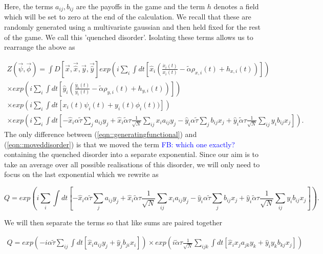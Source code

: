 \documentclass{article}
\newcommand\fb[1]{\textcolor{blue}{FB: #1}}
\begin{document}
	Here, the terms $a_{ij}, b_{ij}$ are the payoffs in the game and the term $h$ denotes a field
	which will be set to zero at the end of the calculation. We recall that these are randomly
	generated using a multivariate gaussian and then held fixed for the rest of the game. We call
	this 'quenched disorder'. Isolating these terms allows us to rearrange the above as

	\begin{equation}
	\begin{split}
	\label{eqn::moveddisorder}
		Z(\Vec{\psi}, \Vec{\phi}) = \int D[\Vec{x}, \Vec{\hat{x}}, \Vec{y}, \Vec{\hat{y}}] exp(i
		\sum_i \int dt[\hat{x}_i
		(\frac{\dot{x_i}(t)}{x_i(t)}
			- \tilde{\alpha} \rho_{x, i}(t)+ h_{x, i}(t))]) 
			\\
			\times exp(i \sum_i \int dt[\hat{y}_i
		(\frac{\dot{y_i}(t)}{y_i(t)} 
			- \tilde{\alpha} \rho_{y, i}(t) + h_{y, i}(t))])\\
			\times exp(i \sum_i
		\int dt[x_i(t) \psi_i(t) + y_i(t) \phi_i(t))])\\
		\times exp(i \sum_i \int dt[- \hat{x}_i \alpha \tilde{\tau} \sum_{j} a_
			{ij} 
			y_j +
			\hat{x}_i \tilde{\alpha} \tau \frac{1}{\sqrt{N}} \sum_{i j} x_i a_{ij} y_j - \hat{y}_i
			\alpha 
			\tilde{\tau} \sum_{j} b_
			{ij} 
			x_j +
			\hat{y}_i \tilde{\alpha} \tau \frac{1}{\sqrt{N}} \sum_{i j} y_i b_{ij} x_j]).
	\end{split}
	\end{equation}
	The only difference between (\ref{eqn::generatingfunctional}) and (\ref{eqn::moveddisorder}) is
	that we moved the term \fb{which one exactly?} containing the quenched disorder into a separate exponential. Since our
	aim is to take an average over all possible realisations of this disorder, we will only need to
	focus on the last exponential which we rewrite as

	\begin{equation}
		Q = exp(i \sum_i \int dt[- \hat{x}_i \alpha \tilde{\tau} \sum_{j} a_
			{ij} 
			y_j +
			\hat{x}_i \tilde{\alpha} \tau \frac{1}{\sqrt{N}} \sum_{i j} x_i a_{ij} y_j - \hat{y}_i
			\alpha 
			\tilde{\tau} \sum_{j} b_
			{ij} 
			x_j +
			\hat{y}_i \tilde{\alpha} \tau \frac{1}{\sqrt{N}} \sum_{i j} y_i b_{ij} x_j]).
	\end{equation}

	We will then separate the terms so that like sums are paired together

	\begin{equation}
	\begin{split}
		Q = exp(-i \alpha \tilde{\tau} \sum_{ij} \int dt[\hat{x}_i a_{ij} y_j + \hat{y}_j b_
			{ji} 
			x_i])
			\times
			exp(i \tilde{\alpha} \tau \frac{1}{\sqrt{N}} \sum_{ijk} \int dt[\hat{x}_i x_j
			a_{jk} y_k + \hat{y}_i y_k b_{kj} x_j])
	\end{split}
	\end{equation}
\end{document}
